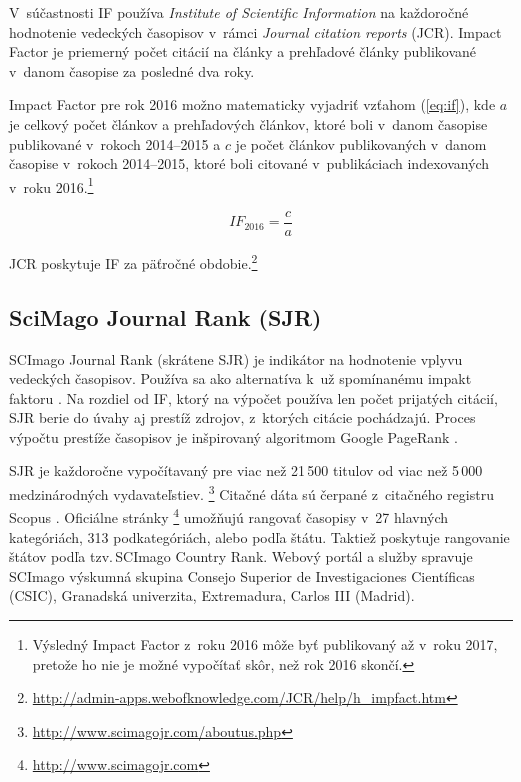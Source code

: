 V~súčastnosti IF používa \emph{Institute of Scientific Information} na
každoročné hodnotenie vedeckých časopisov v~rámci \emph{Journal citation
reports} (JCR).  Impact Factor je priemerný počet citácií na články a
prehľadové články publikované v~danom časopise za posledné dva roky.

Impact Factor pre rok 2016 možno matematicky vyjadriť vzťahom (\ref{eq:if}),
kde $a$ je celkový počet článkov a prehľadových článkov, ktoré boli v~danom
časopise publikované v~rokoch 2014--2015 a $c$ je počet článkov publikovaných
v~danom časopise v~rokoch 2014--2015, ktoré boli citované v~publikáciach
indexovaných v~roku 2016.\footnote{Výsledný Impact Factor z~roku 2016 môže byť
publikovaný až v~roku 2017, pretože ho nie je možné vypočítať skôr, než rok
2016 skončí.}

\begin{equation}
\label{eq:if}
\mathit{IF}_{2016} = \frac{c}{a}
\end{equation}

\noindent JCR poskytuje IF za päťročné obdobie.\footnote{\url{http://admin-apps.webofknowledge.com/JCR/help/h_impfact.htm}}

\subsection{SciMago Journal Rank (SJR)}
\label{sec:sjr}

SCImago Journal Rank (skrátene SJR) je indikátor na hodnotenie vplyvu
vedeckých časopisov. Používa sa ako alternatíva k~už spomínanému impakt faktoru
\citep{Falagas2008}.  Na rozdiel od IF, ktorý na výpočet používa len počet prijatých
citácií, SJR berie do úvahy aj prestíž zdrojov, z~ktorých citácie pochádzajú.
Proces výpočtu prestíže časopisov \citep{GuerreroBote2012} je inšpirovaný algoritmom
Google PageRank\texttrademark{} \citep{Page1999}.

SJR je každoročne vypočítavaný pre viac než 21\,500 titulov od viac než 5\,000
medzinárodných vydavateľstiev.
\footnote{\url{http://www.scimagojr.com/aboutus.php}} Citačné dáta sú čerpané
z~citačného registru Scopus \textregistered. Oficiálne stránky
\footnote{\url{http://www.scimagojr.com}} umožňujú rangovať časopisy v~27
hlavných kategóriách, 313 podkategóriách, alebo podľa štátu.  Taktiež poskytuje
rangovanie štátov podľa tzv.\,SCImago Country Rank.  Webový portál a služby
spravuje SCImago výskumná skupina Consejo Superior de Investigaciones
Científicas (CSIC), Granadská univerzita, Extremadura, Carlos III (Madrid).


